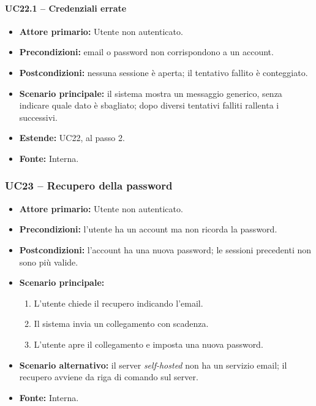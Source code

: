 \documentclass[12pt,a4paper]{article}
\newcommand{\tightlist}{\setlength{\itemsep}{1pt}\setlength{\parskip}{0pt}}
\begin{document}
\paragraph{UC22.1 -- Credenziali errate}
\begin{itemize}
\tightlist
\item \textbf{Attore primario:} Utente non autenticato.
\item \textbf{Precondizioni:} email o password non corrispondono a un account.
\item \textbf{Postcondizioni:} nessuna sessione è aperta; il tentativo fallito è conteggiato.
\item \textbf{Scenario principale:} il sistema mostra un messaggio generico, senza indicare quale dato è sbagliato; dopo diversi tentativi falliti rallenta i successivi.
\item \textbf{Estende:} UC22, al passo 2.
\item \textbf{Fonte:} Interna.
\end{itemize}

\subsubsection{UC23 -- Recupero della password}
\begin{itemize}
\tightlist
\item \textbf{Attore primario:} Utente non autenticato.
\item \textbf{Precondizioni:} l'utente ha un account ma non ricorda la password.
\item \textbf{Postcondizioni:} l'account ha una nuova password; le sessioni precedenti non sono più valide.
\item \textbf{Scenario principale:}
\begin{enumerate}
\tightlist
\item L'utente chiede il recupero indicando l'email.
\item Il sistema invia un collegamento con scadenza.
\item L'utente apre il collegamento e imposta una nuova password.
\end{enumerate}
\item \textbf{Scenario alternativo:} il server \emph{self-hosted} non ha un servizio email; il recupero avviene da riga di comando sul server.
\item \textbf{Fonte:} Interna.
\end{itemize}
\end{document}
